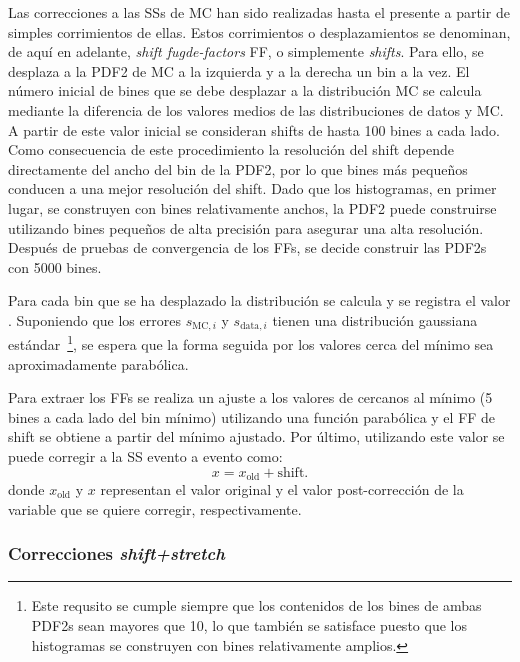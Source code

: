 Las correcciones a las \acp{SS} de \ac{MC} han sido realizadas hasta el presente a partir de simples corrimientos de ellas. Estos corrimientos o desplazamientos se denominan, de aquí en adelante, \textit{shift fugde-factors} \ac{FF}, o simplemente \textit{shifts}.
Para ello, se desplaza a la \ac{PDF2} de \ac{MC} a la izquierda y a la derecha un bin a la vez.
El número inicial de bines que se debe desplazar a la distribución \ac{MC} se calcula mediante la diferencia de los valores medios de las distribuciones de datos y \ac{MC}. A partir de este valor inicial se consideran shifts de hasta 100 bines a cada lado.
Como consecuencia de este procedimiento la resolución del shift depende directamente del ancho del bin de la \ac{PDF2}, por lo que bines más pequeños conducen a una mejor resolución del shift. Dado que los histogramas, en primer lugar, se construyen con bines relativamente anchos, la \ac{PDF2} puede construirse utilizando bines pequeños de alta precisión para asegurar una alta resolución. Después de pruebas de convergencia de los \acp{FF}, se decide construir las \acp{PDF2} con 5000 bines.

Para cada bin que se ha desplazado la distribución se calcula y se registra el valor \chisq. Suponiendo que los errores \(s_{\text{MC},i}\) y \(s_{\text{data},i}\) tienen una distribución gaussiana estándar~\footnote{Este requsito se cumple siempre que los contenidos de los bines de ambas \acp{PDF2} sean mayores que 10, lo que también se satisface puesto que los histogramas se construyen con bines relativamente amplios.}, se espera que la forma seguida por los valores \chisq cerca del mínimo sea aproximadamente parabólica.

Para extraer los \acp{FF} se realiza un ajuste a los valores de \chisq cercanos al mínimo (5 bines a cada lado del bin mínimo) utilizando una función parabólica y el \ac{FF} de shift se obtiene a partir del mínimo ajustado. Por último, utilizando este valor se puede corregir a la \ac{SS} evento a evento como:
\[
	x = x_{\text{old}} + \text{shift}.
\]
donde \(x_{\text{old}}\) y \(x\) representan el valor original y el valor post-corrección de la variable que se quiere corregir, respectivamente.


\subsubsection{Correcciones \textit{shift+stretch}}

